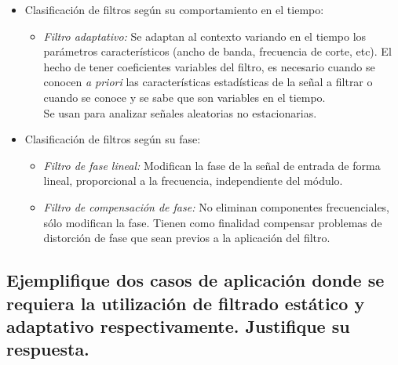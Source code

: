 \documentclass[a4paper,10pt,spanish,oneside]{article}
\begin{document}
\begin{itemize}
\item Clasificación de filtros según su comportamiento en el tiempo:

\begin{itemize}
\item \textit{Filtro adaptativo:} Se adaptan al contexto variando en el tiempo los 				parámetros característicos (ancho de banda, frecuencia de corte, etc). El hecho de 				tener coeficientes variables del filtro, es necesario cuando se conocen \textit{a 				priori} las características estadísticas de la señal a filtrar o cuando se conoce y se 		sabe que son variables en el tiempo.\\
Se usan para analizar señales aleatorias no estacionarias.
\end{itemize}
		
\item Clasificación de filtros según su fase:
	
\begin{itemize}
\item \textit{Filtro de fase lineal:} Modifican la fase de la señal de entrada 		de forma lineal, proporcional a la frecuencia, independiente del módulo.
		
\item \textit{Filtro de compensación de fase:} No eliminan componentes frecuenciales, sólo modifican la fase. Tienen como finalidad compensar problemas de distorción de fase que sean previos a la aplicación del filtro.
\end{itemize}				
		
\end{itemize}

\subsection{Ejemplifique dos casos de aplicación donde se requiera la utilización de filtrado estático y adaptativo respectivamente. Justifique su respuesta.}
\end{document}
